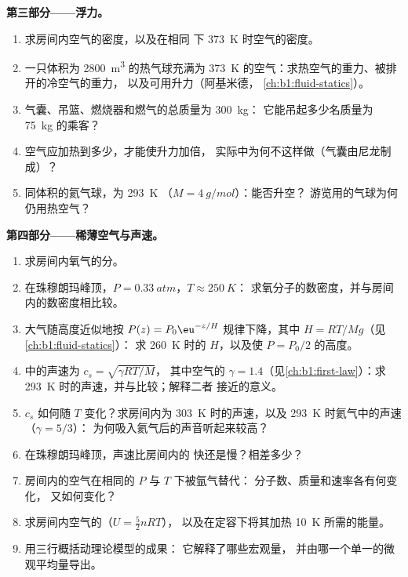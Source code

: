 \begin{problem}
\medskip
\noindent\textbf{第三部分——浮力。}
\begin{enumerate}[resume]
  \item 求房间内空气的密度，以及在相同
        下 \qty{373}{K} 时空气的密度。
  \item 一只体积为 \qty{2800}{m^3} 的热气球充满为
        \qty{373}{K} 的空气：求热空气的重力、被排开的冷空气的重力，
        以及可用升力（阿基米德，
        \cref{ch:b1:fluid-statics}）。
  \item 气囊、吊篮、燃烧器和燃气的总质量为 \qty{300}{kg}：
        它能吊起多少名质量为 \qty{75}{kg} 的乘客？
  \item 空气应加热到多少，才能使升力加倍，
        实际中为何不这样做（气囊由尼龙制成）？
  \item 同体积的氦气球，为 \qty{293}{K}
        （$M = \qty{4}{g/mol}$）：能否升空？
        游览用的气球为何仍用热空气？
\end{enumerate}

\medskip
\noindent\textbf{第四部分——稀薄空气与声速。}
\begin{enumerate}[resume]
  \item 求房间内氧气的分。
  \item 在珠穆朗玛峰顶，$P = \qty{0.33}{atm}$，$T \approx \qty{250}{K}$：
        求氧分子的数密度，并与房间内的数密度相比较。
  \item 大气随高度近似地按
        $P(z) = P_0\eu^{-z/H}$ 规律下降，其中 $H = RT/Mg$（见\cref{ch:b1:fluid-statics}）：
        求 \qty{260}{K} 时的 $H$，以及使 $P = P_0/2$ 的高度。
  \item {}中的声速为 $c_s = \sqrt{\gamma RT/M}$，
        其中空气的 $\gamma = 1.4$（见\cref{ch:b1:first-law}）：求
        \qty{293}{K} 时的声速，并与比较；解释二者
        接近的意义。
  \item $c_s$ 如何随 $T$ 变化？求房间内为
        \qty{303}{K} 时的声速，以及 \qty{293}{K} 时氦气中的声速（$\gamma = 5/3$）：
        为何吸入氦气后的声音听起来较高？
  \item 在珠穆朗玛峰顶，声速比房间内的
        快还是慢？相差多少？
  \item 房间内的空气在相同的 $P$ 与 $T$ 下被氩气替代：
        分子数、质量和速率各有何变化，
        又如何变化？
  \item 求房间内空气的（$U = \tfrac52 nRT$），
        以及在定容下将其加热 \qty{10}{K} 所需的能量。
  \item 用三行概括动理论模型的成果：
        它解释了哪些宏观量，
        并由哪一个单一的微观平均量导出。
\end{enumerate}
\end{problem}
